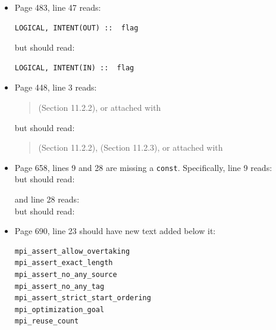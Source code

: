 \begin{itemize}
\noindent but should read:

\begin{verbatim}
if (err!=MPI_SUCCESS && err!=MPI_T_ERR_INVALID_INDEX) return err;
\end{verbatim}

\item Page 483, line 47 reads:
\begin{verbatim}
LOGICAL, INTENT(OUT) ::  flag
\end{verbatim}

\noindent but should read:
\begin{verbatim}
LOGICAL, INTENT(IN) ::  flag
\end{verbatim}

\item Page 448, line 3 reads:
\begin{quote}
 (Section 11.2.2), or attached with 
\end{quote}

\noindent but should read:
\begin{quote}
 (Section 11.2.2), 
(Section 11.2.3), or attached with 
\end{quote}

\item Page 658, lines 9 and 28 are missing a \texttt{const}. Specifically,
line 9 reads:\\
but should read:\\

and line 28 reads:\\
but should read:\\


\item Page 690, line 23 should have new text added below it:

\begin{verbatim}
mpi_assert_allow_overtaking
mpi_assert_exact_length
mpi_assert_no_any_source
mpi_assert_no_any_tag
mpi_assert_strict_start_ordering
mpi_optimization_goal
mpi_reuse_count
\end{verbatim}

\end{itemize}
